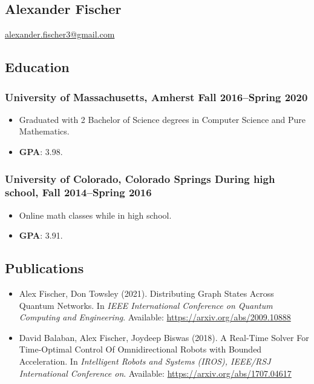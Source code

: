 \documentclass{article}
\begin{document}
	\begin{center}
		\section*{Alexander Fischer}
			\href{mailto:alexander.fischer3@gmail.com}{alexander.fischer3@gmail.com}
    \end{center}
	\subsection*{Education}
		\subsubsection*{University of Massachusetts, Amherst \hfill \normalfont \normalsize Fall 2016--Spring 2020}
			\begin{itemize}[noitemsep,leftmargin=40pt]
				\item Graduated with 2 Bachelor of Science degrees in Computer Science and Pure Mathematics.
				\item \textbf{GPA}: 3.98.
			\end{itemize}
		\subsubsection*{University of Colorado, Colorado Springs \hfill \normalfont \normalsize During high school, Fall 2014--Spring 2016}
			\begin{itemize}[noitemsep,leftmargin=40pt]
			\item Online math classes while in high school.
			\item \textbf{GPA}: 3.91.
			\end{itemize}
	\subsection*{Publications}
		\begin{itemize}[noitemsep,leftmargin=40pt]
		\item Alex Fischer, Don Towsley (2021). Distributing Graph States Across Quantum Networks. In \textit{IEEE International Conference on Quantum Computing and Engineering}. Available: \href{https://arxiv.org/abs/2009.10888}{https://arxiv.org/abs/2009.10888}
		\item David Balaban, Alex Fischer, Joydeep Biswas (2018). A Real-Time Solver For Time-Optimal Control Of Omnidirectional Robots with Bounded Acceleration. In \textit{Intelligent Robots and Systems (IROS), IEEE/RSJ International Conference on}. Available: \href{https://arxiv.org/abs/1707.04617}{https://arxiv.org/abs/1707.04617}
		\end{itemize}
\end{document}
